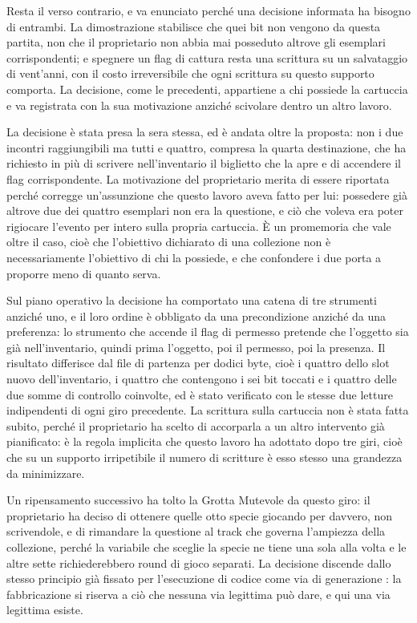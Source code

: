 Resta il verso contrario, e va enunciato perché una decisione informata ha bisogno di entrambi. La dimostrazione stabilisce che quei bit non vengono da questa partita, non che il proprietario non abbia mai posseduto altrove gli esemplari corrispondenti; e spegnere un flag di cattura resta una scrittura su un salvataggio di vent'anni, con il costo irreversibile che ogni scrittura su questo supporto comporta. La decisione, come le precedenti, appartiene a chi possiede la cartuccia e va registrata con la sua motivazione anziché scivolare dentro un altro lavoro.

La decisione è stata presa la sera stessa, ed è andata oltre la proposta: non i due incontri raggiungibili ma tutti e quattro, compresa la quarta destinazione, che ha richiesto in più di scrivere nell'inventario il biglietto che la apre e di accendere il flag corrispondente. La motivazione del proprietario merita di essere riportata perché corregge un'assunzione che questo lavoro aveva fatto per lui: possedere già altrove due dei quattro esemplari non era la questione, e ciò che voleva era poter rigiocare l'evento per intero sulla propria cartuccia. È un promemoria che vale oltre il caso, cioè che l'obiettivo dichiarato di una collezione non è necessariamente l'obiettivo di chi la possiede, e che confondere i due porta a proporre meno di quanto serva.

Sul piano operativo la decisione ha comportato una catena di tre strumenti anziché uno, e il loro ordine è obbligato da una precondizione anziché da una preferenza: lo strumento che accende il flag di permesso pretende che l'oggetto sia già nell'inventario, quindi prima l'oggetto, poi il permesso, poi la presenza. Il risultato differisce dal file di partenza per dodici byte, cioè i quattro dello slot nuovo dell'inventario, i quattro che contengono i sei bit toccati e i quattro delle due somme di controllo coinvolte, ed è stato verificato con le stesse due letture indipendenti di ogni giro precedente. La scrittura sulla cartuccia non è stata fatta subito, perché il proprietario ha scelto di accorparla a un altro intervento già pianificato: è la regola implicita che questo lavoro ha adottato dopo tre giri, cioè che su un supporto irripetibile il numero di scritture è esso stesso una grandezza da minimizzare.

Un ripensamento successivo ha tolto la Grotta Mutevole da questo giro: il proprietario ha deciso di ottenere quelle otto specie giocando per davvero, non scrivendole, e di rimandare la questione al track che governa l'ampiezza della collezione, perché la variabile che sceglie la specie ne tiene una sola alla volta e le altre sette richiederebbero round di gioco separati. La decisione discende dallo stesso principio già fissato per l'esecuzione di codice come via di generazione \cite{pokeemerald}: la fabbricazione si riserva a ciò che nessuna via legittima può dare, e qui una via legittima esiste.

